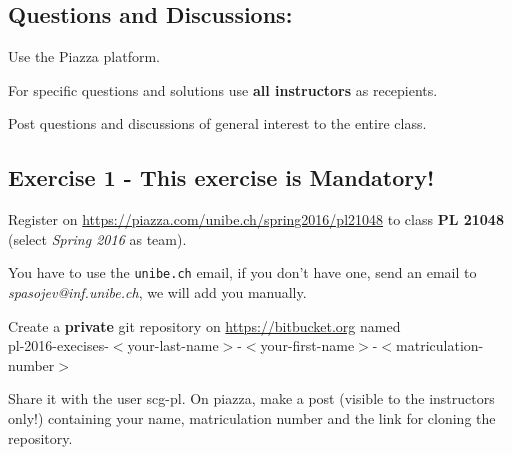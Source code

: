 \documentclass [11pt, a4wide, twoside]{article}
\begin{document}
\subsection*{Questions and Discussions:}
\begin{myitemize}
\item Use the Piazza platform.
\item For specific questions and solutions use \textbf{all instructors} as recepients.
\item Post questions and discussions of general interest to the entire class.
\end{myitemize}

\subsection*{Exercise 1 - This exercise is Mandatory!}
\begin{myitemize}
\item Register on \url{https://piazza.com/unibe.ch/spring2016/pl21048} to class \textbf{PL 21048} (select \emph{Spring 2016} as team).
\item You have to use the \texttt{unibe.ch} email, if you don't have one, send an email to \emph{spasojev@inf.unibe.ch}, we will add you manually.
\item Create a \textbf{private} git repository on \url{https://bitbucket.org} named \\
pl-2016-execises-$<$your-last-name$>$-$<$your-first-name$>$-$<$matriculation-number$>$
\item Share it with the user scg-pl. On piazza, make a post (visible to the instructors only!) containing your name, matriculation number and the link for cloning the repository.

\end{myitemize}
\end{document}
